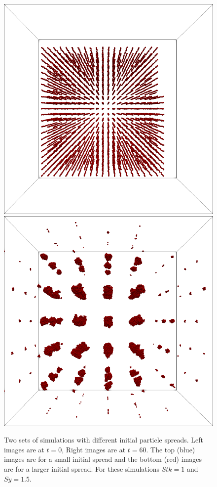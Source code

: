 \documentclass[a4paper,11pt,titlepage]{report}
\begin{document}
\begin{figure}[!htb]
\includegraphics[scale=0.325]{figures/analysis/spread_0.png}
\includegraphics[scale=0.325]{figures/analysis/spread_60.png}
\caption{Two sets of simulations with different initial particle spreads. Left images are at $t = 0$, Right images are at $t = 60$. The top (blue) images are for a small initial spread and the bottom (red) images are for a larger initial spread. For these simulations $Stk = 1$ and $Sy = 1.5$.}
\label{fig:initial spread}
\end{figure}
\end{document}
